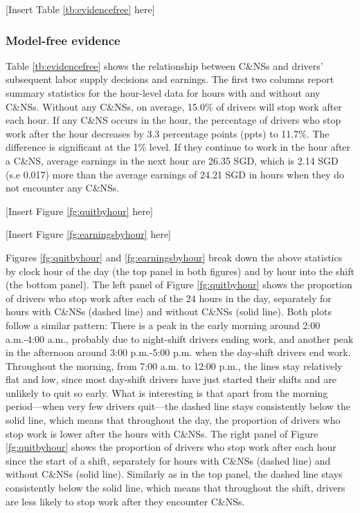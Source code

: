 \documentclass[reviewmode]{AEA}
\begin{document}
\begin{center}
	[Insert Table \ref{tb:evidencefree} here]
\end{center}

\subsubsection{Model-free evidence}
Table \ref{tb:evidencefree} shows the relationship between C\&NSs and drivers' subsequent labor supply decisions and earnings. The first two columns report summary statistics for the hour-level data for hours with and without any C\&NSs. Without any C\&NSs, on average, 15.0\% of drivers will stop work after each hour.
If any C\&NS occurs in the hour, the percentage of drivers who stop work after the hour decreases by 3.3 percentage points (ppts) to 11.7\%. The difference is significant at the 1\% level. If they continue to work in the hour after a C\&NS, average earnings in the next hour are 26.35 SGD, which is 2.14 SGD (s.e 0.017) more than the average earnings of 24.21 SGD in hours when they do not encounter any C\&NSs. 
\begin{center}
	[Insert Figure \ref{fg:quitbyhour} here]
\end{center}
\begin{center}
	[Insert Figure \ref{fg:earningsbyhour} here]
\end{center}

Figures \ref{fg:quitbyhour} and \ref{fg:earningsbyhour} break down the above  statistics by clock hour of the day (the top panel in both figures) and by hour into the shift (the bottom panel). The left panel of Figure \ref{fg:quitbyhour} shows the proportion of drivers who stop work after each of the 24 hours in the day, separately for hours with C\&NSs (dashed line) and without C\&NSs (solid line). Both plots follow a similar pattern: There is a peak in the early morning around 2:00 a.m.-4:00 a.m., probably due to night-shift drivers ending work, and another peak in the afternoon around 3:00 p.m.-5:00 p.m. when the day-shift drivers end work. Throughout the morning, from 7:00 a.m. to 12:00 p.m., the lines stay relatively flat and low, since most day-shift drivers have just started their shifts and are unlikely to quit so early. What is interesting is that apart from the morning period---when very few drivers quit---the dashed line stays consistently below the solid line, which means that throughout  the day, the proportion of drivers who stop work is lower after the hours with C\&NSs. The right panel of Figure \ref{fg:quitbyhour} shows the proportion of drivers who stop work after each hour since the start of a shift, separately for hours with C\&NSs (dashed line) and without C\&NSs (solid line). Similarly as in the top panel, the dashed line stays consistently below the solid line, which means that throughout the shift, drivers are less likely to stop work after they encounter C\&NSs.
\end{document}
